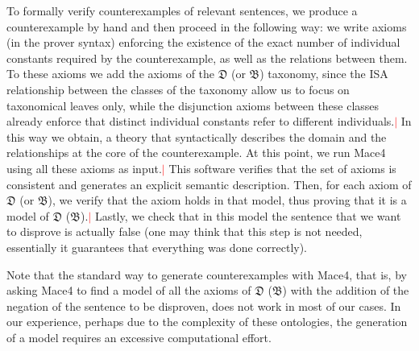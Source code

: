 \documentclass[ao]{iosart2x}
\newcommand{\nb}[1]{\textcolor{red}{$|$}\marginpar{\hspace*{-0cm}\parbox{20mm}{\scriptsize\raggedright\textcolor{red}{#1}}}}
\newcommand{\dolce}{{\textsc{dolce}}}
\newcommand{\bfo}{{\textsc{bfo}}}
\newcommand {\thdolce} {\ensuremath{\mathfrak{D}}}
\newcommand {\thbfo} {\ensuremath{\mathfrak{B}}}
\begin{document}
To formally verify counterexamples of relevant sentences, we produce a counterexample by hand and then proceed in the following way: we write axioms (in the prover syntax) enforcing the existence of the exact number of individual constants required by the counterexample, as well as the relations between them. To these axioms we add the axioms of the {$\thdolce$} (or  {$\thbfo$}) taxonomy, %
since the ISA relationship between the classes of the taxonomy allow us to focus on taxonomical leaves only, while the disjunction axioms between these classes already enforce that distinct individual constants refer to different individuals.\nb{CM: non ho capito questo, non è possibile avere due costanti dello stesso tipo foglia?} In this way we obtain, a theory that syntactically describes the domain and the relationships at the core of the counterexample. 
At this point, we run Mace4 using all these axioms as input.\nb{CM: è vero questo? mi ricordavo che facevamo andare solo il prover} This software verifies that the set of axioms is consistent and generates an explicit semantic description. Then, for each axiom of {$\thdolce$} (or $\thbfo$), we verify that the axiom holds in that model, thus proving that it is a model of {$\thdolce$} ($\thbfo$).\nb{SB: il testo era ambiguo e ho cambiato, controllate} 
Lastly, we check that in this model the sentence that we want to disprove is actually false (one may think that this step is not needed, essentially it guarantees that everything was done correctly).

Note that the standard way to generate counterexamples with Mace4, that is, by asking Mace4 to find a model of all the axioms of {$\thdolce$} ($\thbfo$) with the addition of the negation of the sentence to be disproven, does not work in most of our cases. In our experience, perhaps due to the complexity of these ontologies, the generation of a model requires an excessive computational effort.

%
\end{document}
